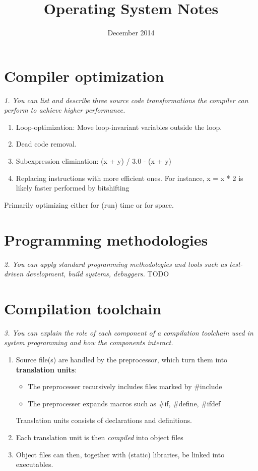 \documentclass{article}
\title{Operating System Notes}
\author{December 2014}
\date{}
\begin{document}
\maketitle
\tableofcontents
\pagebreak

\section{Compiler optimization}
\emph{1. You can list and describe three source code transformations the compiler can perform to achieve higher performance.}

\begin{enumerate}
	\item Loop-optimization: Move loop-invariant variables outside the loop.
	\item Dead code removal.
	\item Subexpression elimination: (x + y) / 3.0 - (x + y)
	\item Replacing instructions with more efficient ones. For instance, x = x * 2 is likely faster performed by bitshifting
\end{enumerate}

Primarily optimizing either for (run) time or for space.


\section{Programming methodologies}
\emph{2. You can apply standard programming methodologies and tools such as test-driven development, build systems, debuggers.}
TODO


\section{Compilation toolchain}
\emph{3. You can explain the role of each component of a compilation toolchain used in system programming and how the components interact.}

\begin{enumerate}
	\item Source file(s) are handled by the preprocessor, which turn them into \textbf{translation units}:
	\begin{itemize}
		\item The preprocesser recursively includes files marked by \#include
		\item The preprocesser expands macros such as \#if, \#define, \#ifdef
	\end{itemize}
	Translation units consists of declarations and definitions.
	\item Each translation unit is then \emph{compiled} into object files
	\item Object files can then, together with (static) libraries, be linked into executables.
\end{enumerate}
\end{document}
